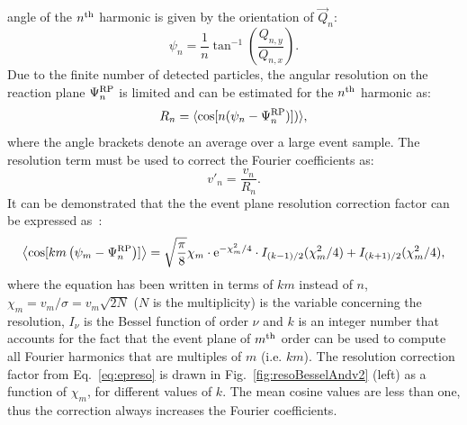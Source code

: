 angle of the $n^{\rm th}$ harmonic is given by the orientation of $\vec{Q}_n$:
\begin{equation}
\psi_n = \dfrac{1}{n} \tan^{-1} \left(\dfrac{Q_{n,y}}{Q_{n,x}}\right).
\end{equation}
Due to the finite number of detected particles, the
angular resolution on the reaction plane $\Psi_n^{\rm RP}$ is limited and 
can be estimated for the $n^{\rm th}$ harmonic as:
\begin{equation}
R_n = \langle {\rm cos}[n({\rm \psi}_n-{\rm \Psi}_n^{\rm RP})]) \rangle ,
\end{equation}
where the angle brackets denote an average over a large event sample.
The resolution term must be used to correct the Fourier coefficients as:
\begin{equation}
v'_n = \frac{v_n}{R_n}.
\end{equation}
It can be demonstrated that the the event plane resolution correction factor
can be expressed as~\cite{Poskanzer:1998yz}:
\begin{equation}
\label{eq:epreso}
\left\langle \cos [km\left( \psi_m-\Psi_n^{\rm RP}\right)]\right\rangle = \sqrt{\dfrac{\pi }{8}} \chi_m \cdot {\rm e}^{-\chi_m^2/4} \cdot I_{(k-1)/2}(\chi_m^2/4)+I_{(k+1)/2}(\chi_m^2/4),
\end{equation}
where the equation has been written in terms of $km$ 
instead of $n$, $\chi_m= v_m/\sigma = v_m\sqrt{2N}$ ($N$ is the multiplicity) is the variable concerning the
resolution, $I_\nu$ is the Bessel function of order $\nu$ and
$k$ is an integer number that accounts for the fact that the 
event plane of $m^{\rm th}$ order can be used to compute all Fourier harmonics that are multiples
of $m$ (i.e. $km$). The resolution correction factor from Eq.~\ref{eq:epreso} is
drawn in Fig.~\ref{fig:resoBesselAndv2} (left) as a function of $\chi_m$, for 
different values of $k$. 
The mean cosine values are less than one, thus the 
correction always increases the Fourier coefficients.
